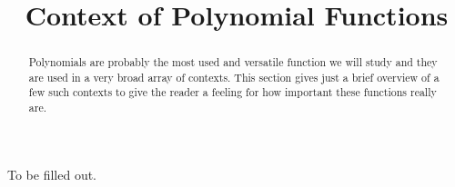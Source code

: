 \documentclass{ximera}
\title{Context of Polynomial Functions}
\begin{document}
\begin{abstract}
    Polynomials are probably the most used and versatile function we will study and they are used in a very broad array of contexts. This section gives just a brief overview of a few such contexts to give the reader a feeling for how important these functions really are.
\end{abstract}
\maketitle
To be filled out.

%
%
%
%
\end{document}
